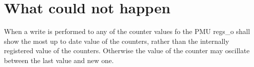 \section{What could not happen}
When a write is performed to any of the counter values fo the PMU regs\_o shall show the most up to date value of the counters, rather than the internally registered value of the counters. Otherwise the value of the counter may oscillate between the last value and new one. 
